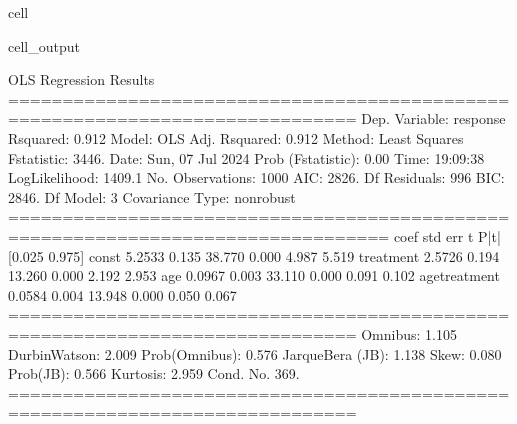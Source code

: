 \documentclass[letterpaper,10pt,english]{jupyterBook}
\begin{document}
\begin{sphinxuseclass}{cell}
\begin{sphinxVerbatimOutput}
\begin{sphinxuseclass}{cell_output}
\begin{sphinxVerbatim}[commandchars=\\\{\}]
                            OLS Regression Results                            
==============================================================================
Dep. Variable:               response   R\PYGZhy{}squared:                       0.912
Model:                            OLS   Adj. R\PYGZhy{}squared:                  0.912
Method:                 Least Squares   F\PYGZhy{}statistic:                     3446.
Date:                Sun, 07 Jul 2024   Prob (F\PYGZhy{}statistic):               0.00
Time:                        19:09:38   Log\PYGZhy{}Likelihood:                \PYGZhy{}1409.1
No. Observations:                1000   AIC:                             2826.
Df Residuals:                     996   BIC:                             2846.
Df Model:                           3                                         
Covariance Type:            nonrobust                                         
=================================================================================
                    coef    std err          t      P\PYGZgt{}|t|      [0.025      0.975]
\PYGZhy{}\PYGZhy{}\PYGZhy{}\PYGZhy{}\PYGZhy{}\PYGZhy{}\PYGZhy{}\PYGZhy{}\PYGZhy{}\PYGZhy{}\PYGZhy{}\PYGZhy{}\PYGZhy{}\PYGZhy{}\PYGZhy{}\PYGZhy{}\PYGZhy{}\PYGZhy{}\PYGZhy{}\PYGZhy{}\PYGZhy{}\PYGZhy{}\PYGZhy{}\PYGZhy{}\PYGZhy{}\PYGZhy{}\PYGZhy{}\PYGZhy{}\PYGZhy{}\PYGZhy{}\PYGZhy{}\PYGZhy{}\PYGZhy{}\PYGZhy{}\PYGZhy{}\PYGZhy{}\PYGZhy{}\PYGZhy{}\PYGZhy{}\PYGZhy{}\PYGZhy{}\PYGZhy{}\PYGZhy{}\PYGZhy{}\PYGZhy{}\PYGZhy{}\PYGZhy{}\PYGZhy{}\PYGZhy{}\PYGZhy{}\PYGZhy{}\PYGZhy{}\PYGZhy{}\PYGZhy{}\PYGZhy{}\PYGZhy{}\PYGZhy{}\PYGZhy{}\PYGZhy{}\PYGZhy{}\PYGZhy{}\PYGZhy{}\PYGZhy{}\PYGZhy{}\PYGZhy{}\PYGZhy{}\PYGZhy{}\PYGZhy{}\PYGZhy{}\PYGZhy{}\PYGZhy{}\PYGZhy{}\PYGZhy{}\PYGZhy{}\PYGZhy{}\PYGZhy{}\PYGZhy{}\PYGZhy{}\PYGZhy{}\PYGZhy{}\PYGZhy{}
const             5.2533      0.135     38.770      0.000       4.987       5.519
treatment         2.5726      0.194     13.260      0.000       2.192       2.953
age               0.0967      0.003     33.110      0.000       0.091       0.102
age\PYGZus{}treatment     0.0584      0.004     13.948      0.000       0.050       0.067
==============================================================================
Omnibus:                        1.105   Durbin\PYGZhy{}Watson:                   2.009
Prob(Omnibus):                  0.576   Jarque\PYGZhy{}Bera (JB):                1.138
Skew:                          \PYGZhy{}0.080   Prob(JB):                        0.566
Kurtosis:                       2.959   Cond. No.                         369.
==============================================================================


\end{sphinxVerbatim}
\end{sphinxuseclass}
\end{sphinxVerbatimOutput}
\end{sphinxuseclass}
\end{document}
